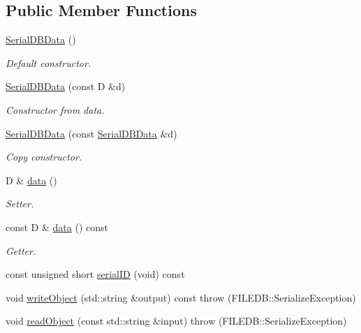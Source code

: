 \subsection*{Public Member Functions}
\begin{DoxyCompactItemize}
\item 
\mbox{\hyperlink{classADATIO_1_1SerialDBData_a07279a443371f31d9e0ef857fab17fa5}{Serial\+D\+B\+Data}} ()
\begin{DoxyCompactList}\small\item\em Default constructor. \end{DoxyCompactList}\item 
\mbox{\hyperlink{classADATIO_1_1SerialDBData_afe5b91aca4221cfce681c85498a46f0c}{Serial\+D\+B\+Data}} (const D \&d)
\begin{DoxyCompactList}\small\item\em Constructor from data. \end{DoxyCompactList}\item 
\mbox{\hyperlink{classADATIO_1_1SerialDBData_a740c06f0022817ca9c071d186d7b3e92}{Serial\+D\+B\+Data}} (const \mbox{\hyperlink{classADATIO_1_1SerialDBData}{Serial\+D\+B\+Data}} \&d)
\begin{DoxyCompactList}\small\item\em Copy constructor. \end{DoxyCompactList}\item 
D \& \mbox{\hyperlink{classADATIO_1_1SerialDBData_af4a3864baddbecbc6177f164f8a1f664}{data}} ()
\begin{DoxyCompactList}\small\item\em Setter. \end{DoxyCompactList}\item 
const D \& \mbox{\hyperlink{classADATIO_1_1SerialDBData_a5532be95ec6214348c087afd8b2ff683}{data}} () const
\begin{DoxyCompactList}\small\item\em Getter. \end{DoxyCompactList}\item 
const unsigned short \mbox{\hyperlink{classADATIO_1_1SerialDBData_a513643be38434a570d655602330aade9}{serial\+ID}} (void) const
\item 
void \mbox{\hyperlink{classADATIO_1_1SerialDBData_a5266e4f1c065f0776f9974d6fad51a2f}{write\+Object}} (std\+::string \&output) const  throw (\+F\+I\+L\+E\+D\+B\+::\+Serialize\+Exception)
\item 
void \mbox{\hyperlink{classADATIO_1_1SerialDBData_a2f7405b96f413b1787fc2072b8932c20}{read\+Object}} (const std\+::string \&input)  throw (\+F\+I\+L\+E\+D\+B\+::\+Serialize\+Exception)

\end{DoxyCompactItemize}
